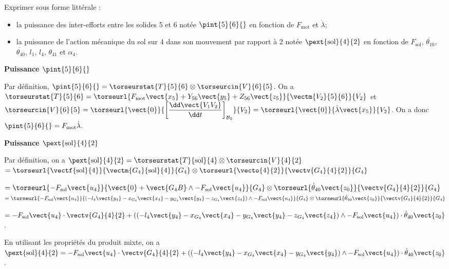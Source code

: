 \documentclass[11pt]{article}
\begin{document}
\UPSTIquestion  Exprimer sous forme littérale :
\begin{itemize}
\item la puissance des inter-efforts entre les solides 5 et 6 notée $\pint{5}{6}{}$ en fonction de $F_{\text{mot}}$ et $\dot{\lambda}$;
\item la puissance de l’action mécanique du sol sur 4 dans son mouvement par rapport à 2 notée $\pext{\text{sol}}{4}{2}$ en fonction de $F_{\text{sol}}$, $\dot{\theta_{10}}$, $\dot{\theta_{40}}$, $l_1$, $l_4$, $\theta_{41}$ et $\alpha_4$.
\end{itemize}

\begin{UPSTIcorrige}
\textbf{Puissance $\pint{5}{6}{}$}

Par définition, $\pint{5}{6}{} = \torseurstat{T}{5}{6}\otimes \torseurcin{V}{6}{5}$. On a 
$ \torseurstat{T}{5}{6} = \torseurl{F_{\text{mot}}\vect{x_5} + Y_{56}\vect{y_5}+ Z_{56}\vect{z_5}}{\vectm{V_2}{5}{6}}{V_2}$
et 
$\torseurcin{V}{6}{5} = 
\torseurl{\vect{0}}{
\left[\dfrac{\dd \vect{V_1V_2}}{\dd t}\right]_{\mathcal{B}_5}
}{V_2}=\torseurl{\vect{0}}{\dot{\lambda}\vect{x_5}}{V_2}$.
On a donc $\pint{5}{6}{} =F_{\text{mot}}\dot{\lambda}$. 

\textbf{Puissance $\pext{\text{sol}}{4}{2}$}

Par définition, on a $\pext{\text{sol}}{4}{2} = \torseurstat{T}{\text{sol}}{4} \otimes \torseurcin{V}{4}{2}$
$ = \torseurl{\vectf{\text{sol}}{4}}{\vectm{G_4}{\text{sol}}{4}}{G_4} \otimes \torseurl{\vecto{4}{2}}{\vectv{G_4}{4}{2}}{G_4}$

$ = \torseurl{-F_{\text{sol}}\vect{u_4}}{\vect{0} + \vect{G_4 B} \wedge -F_{\text{sol}}\vect{u_4}  }{G_4} \otimes \torseurl{\dot{\theta}_{40}\vect{z_0}}{\vectv{G_4}{4}{2}}{G_4} $ 
$ = \torseurl{-F_{\text{sol}}\vect{u_4}}{\left( -l_4 \vect{y_4} -  x_{G_4} \vect{x_4}- y_{G_4} \vect{y_4}- z_{G_4} \vect{z_4} \right)\wedge -F_{\text{sol}}\vect{u_4}  }{G_4} \otimes \torseurl{\dot{\theta}_{40}\vect{z_0}}{\vectv{G_4}{4}{2}}{G_4} $ 

$
=-F_{\text{sol}}\vect{u_4} \cdot \vectv{G_4}{4}{2} + \left(\left( -l_4 \vect{y_4} -  x_{G_4} \vect{x_4}- y_{G_4} \vect{y_4}- z_{G_4} \vect{z_4} \right)\wedge -F_{\text{sol}}\vect{u_4}  \right)\cdot \dot{\theta}_{40}\vect{z_0}
$. 

En utilisant les propriétés du produit mixte, on a 
$
\pext{\text{sol}}{4}{2} =-F_{\text{sol}}\vect{u_4} \cdot \vectv{G_4}{4}{2} + \left(\left( -l_4 \vect{y_4} -  x_{G_4} \vect{x_4}- y_{G_4} \vect{y_4}\right)\wedge -F_{\text{sol}}\vect{u_4}  \right)\cdot \dot{\theta}_{40}\vect{z_0}
$.


\end{UPSTIcorrige}
\end{document}

